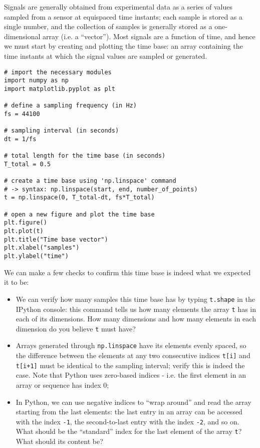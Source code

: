 Signals are generally obtained from experimental data as a series of values sampled from a sensor at equispaced time instants; each sample is stored as a single number, and the collection of samples is generally stored as a one-dimensional array (i.e. a ``vector''). Most signals are a function of time, and hence we must start by creating and plotting the time base: an array containing the time instants at which the signal values are sampled or generated.

\begin{lstlisting}[frame=single]
# import the necessary modules
import numpy as np
import matplotlib.pyplot as plt

# define a sampling frequency (in Hz)
fs = 44100

# sampling interval (in seconds)
dt = 1/fs

# total length for the time base (in seconds)
T_total = 0.5

# create a time base using 'np.linspace' command
# -> syntax: np.linspace(start, end, number_of_points)
t = np.linspace(0, T_total-dt, fs*T_total)

# open a new figure and plot the time base
plt.figure()
plt.plot(t)
plt.title("Time base vector")
plt.xlabel("samples")
plt.ylabel("time")
\end{lstlisting}

We can make a few checks to confirm this time base is indeed what we expected it to be:

\begin{itemize}
	\item We can verify how many samples this time base has by typing {\tt t.shape} in the IPython console: this command tells us how many elements the array {\tt t} has in each of its dimensions. How many dimensions and how many elements in each dimension do you believe {\tt t} must have?
	\item Arrays generated through {\tt np.linspace} have its elements evenly spaced, so the difference between the elements at any two consecutive indices {\tt t[i]} and {\tt t[i+1]} must be identical to the sampling interval; verify this is indeed the case. Note that Python uses zero-based indices - i.e. the first element in an array or sequence has index 0;
	\item In Python, we can use negative indices to ``wrap around'' and read the array starting from the last elements: the last entry in an array can be accessed with the index {\tt -1}, the second-to-last entry with the index {\tt -2}, and so on. What should be the ``standard'' index for the last element of the array {\tt t}? What should its content be?
\end{itemize}


